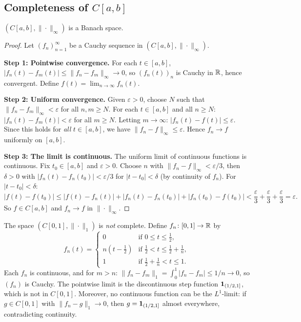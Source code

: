 \documentclass[11pt,a4paper]{article}
\begin{document}
\subsection{Completeness of $C[a,b]$}

\begin{theorem}
\label{thm:Cab_banach}
$(C[a,b], \|\cdot\|_\infty)$ is a Banach space.
\end{theorem}

\begin{proof}
Let $(f_n)_{n=1}^\infty$ be a Cauchy sequence in $(C[a,b], \|\cdot\|_\infty)$.

\textbf{Step 1: Pointwise convergence.} For each $t \in [a,b]$,
$|f_n(t) - f_m(t)| \le \|f_n - f_m\|_\infty \to 0$, so $(f_n(t))_n$ is
Cauchy in $\mathbb{R}$, hence convergent. Define $f(t) = \lim_{n \to \infty} f_n(t)$.

\textbf{Step 2: Uniform convergence.} Given $\varepsilon > 0$, choose $N$
such that $\|f_n - f_m\|_\infty < \varepsilon$ for all $n, m \ge N$. For
each $t \in [a,b]$ and all $n \ge N$:
$|f_n(t) - f_m(t)| < \varepsilon$ for all $m \ge N$. Letting $m \to \infty$:
$|f_n(t) - f(t)| \le \varepsilon$. Since this holds for \emph{all}
$t \in [a,b]$, we have $\|f_n - f\|_\infty \le \varepsilon$. Hence
$f_n \to f$ uniformly on $[a,b]$.

\textbf{Step 3: The limit is continuous.} The uniform limit of continuous
functions is continuous. Fix $t_0 \in [a,b]$ and $\varepsilon > 0$. Choose
$n$ with $\|f_n - f\|_\infty < \varepsilon/3$, then $\delta > 0$ with
$|f_n(t) - f_n(t_0)| < \varepsilon/3$ for $|t - t_0| < \delta$ (by
continuity of $f_n$). For $|t - t_0| < \delta$:
\[
|f(t) - f(t_0)| \le |f(t) - f_n(t)| + |f_n(t) - f_n(t_0)|
  + |f_n(t_0) - f(t_0)| < \frac{\varepsilon}{3} + \frac{\varepsilon}{3}
  + \frac{\varepsilon}{3} = \varepsilon.
\]
So $f \in C[a,b]$ and $f_n \to f$ in $\|\cdot\|_\infty$.
\end{proof}

\begin{example}
\label{ex:Cab_not_banach_L1}
The space $(C[0,1], \|\cdot\|_1)$ is \emph{not} complete. Define
$f_n \colon [0,1] \to \mathbb{R}$ by
\[
f_n(t) = \begin{cases}
0 & \text{if } 0 \le t \le \tfrac{1}{2}, \\
n(t - \tfrac{1}{2}) & \text{if } \tfrac{1}{2} < t \le \tfrac{1}{2} +
  \tfrac{1}{n}, \\
1 & \text{if } \tfrac{1}{2} + \tfrac{1}{n} < t \le 1.
\end{cases}
\]
Each $f_n$ is continuous, and for $m > n$:
$\|f_n - f_m\|_1 = \int_0^1 |f_n - f_m| \le 1/n \to 0$, so $(f_n)$ is
Cauchy. The pointwise limit is the discontinuous step function
$\mathbf{1}_{(1/2, 1]}$, which is not in $C[0,1]$. Moreover, no continuous
function can be the $L^1$-limit: if $g \in C[0,1]$ with $\|f_n - g\|_1 \to 0$,
then $g = \mathbf{1}_{(1/2,1]}$ almost everywhere, contradicting continuity.
\end{example}
\end{document}
